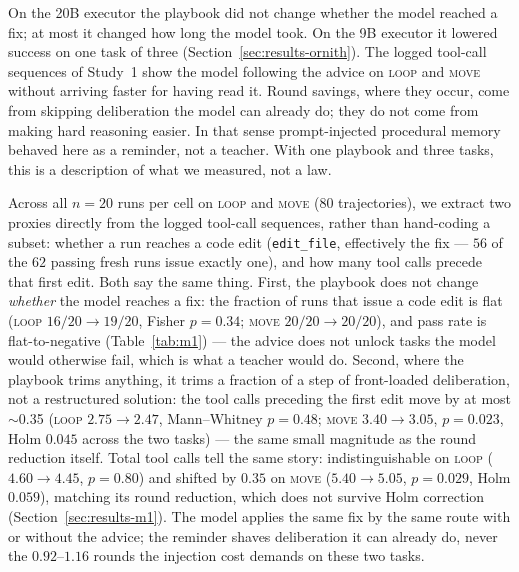 \documentclass[smallcondensed,natbib]{svjour3}
\begin{document}
On the 20B executor the playbook did not change whether the model
reached a fix; at most it changed how long the model took. On the 9B
executor it lowered success on one task of three
(Section~\ref{sec:results-ornith}). The logged
tool-call sequences of Study~1 show the model following the advice on
\textsc{loop} and \textsc{move} without arriving faster for having
read it. Round savings, where they occur, come from skipping
deliberation the model can already do; they do not come from making
hard reasoning easier. In that sense prompt-injected procedural memory
behaved here as a reminder, not a teacher. With one playbook and three
tasks, this is a description of what we measured, not a law.

Across all $n=20$ runs per cell on \textsc{loop} and \textsc{move}
(80 trajectories), we extract two proxies directly
from the logged tool-call sequences, rather than hand-coding a subset:
whether a run reaches a code edit (\texttt{edit\_file}, effectively the
fix --- $56$ of the $62$ passing fresh runs issue exactly one), and how
many tool calls precede that first edit. Both say the same thing. First,
the playbook does not change \emph{whether} the model reaches a fix: the
fraction of runs that issue a code edit is flat (\textsc{loop}
$16/20\to19/20$, Fisher $p=0.34$; \textsc{move} $20/20\to20/20$), and
pass rate is flat-to-negative (Table~\ref{tab:m1}) --- the advice does
not unlock tasks the model would otherwise fail, which is what a teacher
would do. Second, where the playbook trims anything, it trims a fraction
of a step of front-loaded deliberation, not a restructured solution:
the tool calls preceding the first edit move by at most $\sim$0.35
(\textsc{loop} $2.75\to2.47$, Mann--Whitney $p=0.48$; \textsc{move}
$3.40\to3.05$, $p=0.023$, Holm $0.045$ across the two tasks) --- the same small magnitude as the round
reduction itself. Total tool calls tell the same story:
indistinguishable on \textsc{loop} ($4.60\to4.45$, $p=0.80$) and
shifted by $0.35$ on \textsc{move} ($5.40\to5.05$, $p=0.029$, Holm
$0.059$), matching
its round reduction, which does not survive Holm correction
(Section~\ref{sec:results-m1}). The model applies the same fix by the same route
with or without the advice; the reminder shaves deliberation it can
already do, never the $0.92$--$1.16$ rounds the injection cost demands
on these two tasks.
\end{document}
